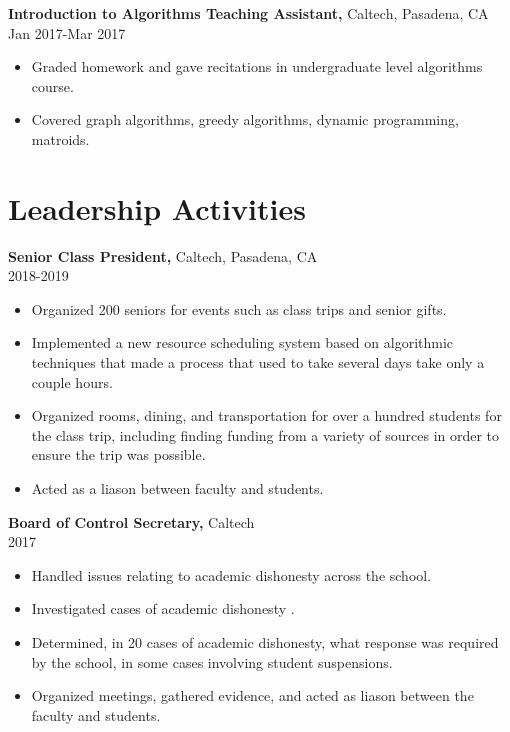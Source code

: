 \documentclass[margin]{res}
\begin{document}
\begin{resume}
{\bf Introduction to Algorithms Teaching Assistant,} Caltech, Pasadena, CA \\ Jan 2017-Mar 2017
\begin{itemize} \itemsep -2pt %
\item Graded homework and gave recitations in undergraduate level algorithms course.
\item Covered graph algorithms, greedy algorithms, dynamic programming, matroids.
\end{itemize}

\section{Leadership   Activities} 
       {\bf Senior Class President,} Caltech, Pasadena, CA    \\         2018-2019 
        \begin{itemize} \itemsep -2pt
          \item Organized 200 seniors for events such as class trips and senior gifts.
          \item Implemented a new resource scheduling system based on algorithmic techniques that made a process that used to take several days take only a couple hours.
          \item Organized rooms, dining, and transportation for over a hundred students for the class trip, including finding funding from a variety of sources in order to ensure the trip was possible.
          \item Acted as a liason between faculty and students.
		 \end{itemize}

		{\bf Board of Control Secretary,} Caltech \\   2017
        \begin{itemize} \itemsep -2pt
             \item Handled issues relating to academic dishonesty across the school.
             \item Investigated cases of academic dishonesty .
             \item Determined, in 20 cases of academic dishonesty, what response was required by the school, in some cases involving student suspensions.
             \item Organized meetings, gathered evidence, and acted as liason between the faculty and students.
		 \end{itemize}


\end{resume}
\end{document}
